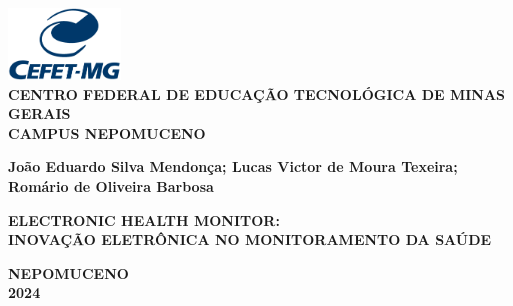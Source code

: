 \thispagestyle{empty}
\begin{titlepage}

\begin{center}
\includegraphics[width=3cm]{graphics/600px-Logo_CEFET-MG_corte.png}\\
\vspace{0.5cm}
{\normalsize \textbf{CENTRO FEDERAL DE EDUCAÇÃO TECNOLÓGICA DE MINAS GERAIS \\
CAMPUS NEPOMUCENO}}

\vspace{0.8cm}
{\large \textbf{João Eduardo Silva Mendonça; Lucas Victor de Moura Texeira; Romário de Oliveira Barbosa}}

\vspace{6cm}

{\large \textbf{ELECTRONIC HEALTH MONITOR: \\ \vspace{0.5 cm} INOVAÇÃO ELETRÔNICA NO MONITORAMENTO DA SAÚDE}} \\
\vspace{0.5 cm}

\vspace{4 cm}


\vspace{3cm}
{\large \textbf{NEPOMUCENO}} \\
{\large \textbf{2024}}
\end{center}
\end{titlepage}

\newpage
\thispagestyle{empty}

\newpage\ \newpage